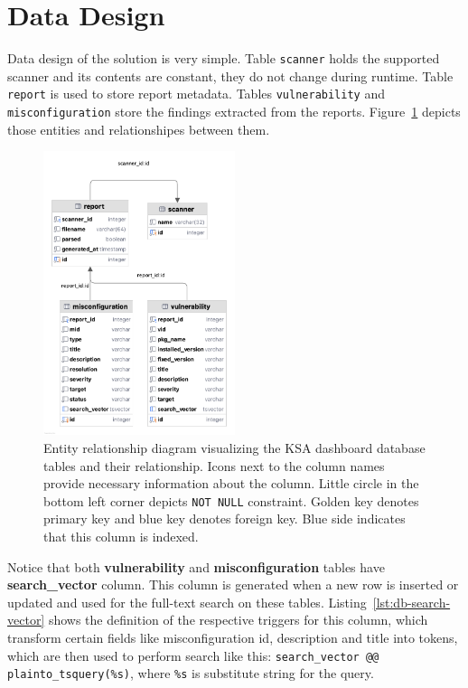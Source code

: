 \section{Data Design}
\label{sec:data-design}

Data design of the solution is very simple. Table \lstinline{scanner} holds the supported scanner and its contents are constant, they do not change during runtime. Table \lstinline{report} is used to store report metadata. Tables \lstinline{vulnerability} and \lstinline{misconfiguration} store the findings extracted from the reports. Figure~\ref{img:er-diagram} depicts those entities and relationshipes between them.

\begin{figure}[!hbt]
	\begin{center}
		\includegraphics[width=0.5\textwidth]{images/er-diagram.png}
        \caption[Entity relationship diagram visualizing the KSA dashboard database tables and their relationship.]{Entity relationship diagram visualizing the KSA dashboard database tables and their relationship. Icons next to the column names provide necessary information about the column. Little circle in the bottom left corner depicts \lstinline{NOT NULL} constraint. Golden key denotes primary key and blue key denotes foreign key. Blue side indicates that this column is indexed.}
		\label{img:er-diagram}
	\end{center}
\end{figure}

Notice that both \textbf{vulnerability} and \textbf{misconfiguration} tables have \textbf{search\_vector} column. This column is generated when a new row is inserted or updated and used for the full-text search on these tables. Listing~\ref{lst:db-search-vector} shows the definition of the respective triggers for this column, which transform certain fields like misconfiguration id, description and title into tokens, which are then used to perform search like this: \lstinline{search_vector @@ plainto_tsquery(%s)}, where \lstinline{%s} is substitute string for the query.


